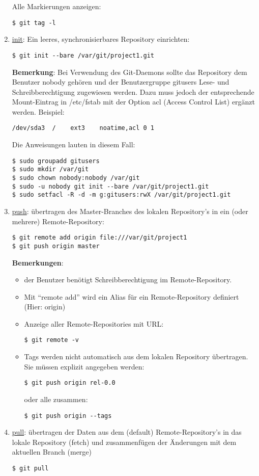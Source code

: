 \begin{enumerate}
Alle Markierungen anzeigen:
\begin{lstlisting}
$ git tag -l
\end{lstlisting}
\newslide
\item \underline{init}:
Ein leeres, synchronisierbares Repository einrichten:
\begin{lstlisting}
$ git init --bare /var/git/project1.git
\end{lstlisting}
{\bfseries Bemerkung}: Bei Verwendung des Git-Daemons sollte das Repository
 dem Benutzer nobody gehören
und der Benutzergruppe gitusers Lese- und Schreibberechtigung
zugewiesen werden.
Dazu muss jedoch der entsprechende Mount-Eintrag in /etc/fstab mit der
Option acl (Access Control List) ergänzt werden. Beispiel:
\begin{verbatim}
/dev/sda3  /	ext3	noatime,acl	0 1
\end{verbatim}
Die Anweisungen lauten in diesem Fall:
\begin{lstlisting}
$ sudo groupadd gitusers
$ sudo mkdir /var/git
$ sudo chown nobody:nobody /var/git
$ sudo -u nobody git init --bare /var/git/project1.git
$ sudo setfacl -R -d -m g:gitusers:rwX /var/git/project1.git
\end{lstlisting}
%
\newslide
\item \underline{push}: übertragen des Master-Branches
 des lokalen Repository's in ein
  (oder mehrere) Remote-Repository:
  \begin{lstlisting}
$ git remote add origin file:///var/git/project1
$ git push origin master
  \end{lstlisting}
{\bfseries Bemerkungen}:
\begin{itemize}
\item der Benutzer benötigt Schreibberechtigung
im Remote-Repository.
\item Mit ``remote add'' wird ein Alias für ein Remote-Repository
  definiert (Hier: origin)
\item Anzeige aller Remote-Repositories mit URL:
  \begin{lstlisting}
$ git remote -v
  \end{lstlisting}
\item Tags werden nicht automatisch aus dem lokalen Repository
  übertragen. Sie müssen explizit angegeben werden:
  \begin{lstlisting}
$ git push origin rel-0.0
  \end{lstlisting}
oder alle zusammen:
\begin{lstlisting}
$ git push origin --tags
\end{lstlisting}
\end{itemize}
%
\item \underline{pull}: übertragen der Daten aus dem (default)
  Remote-Repository's in das lokale Repository (fetch) und
  zusammenfügen der Änderungen mit dem aktuellen Branch (merge)
  \begin{lstlisting}
$ git pull
\end{lstlisting}
\end{enumerate}
